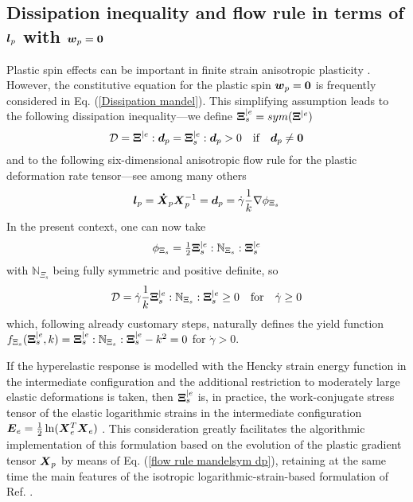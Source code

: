 \documentclass[preprint,review,12pt,sort&compress]{elsarticle}%
\renewcommand{\mathbf}[1]{\mbox{\boldmath $#1$ \unboldmath}  \!\!}
\begin{document}
\subsection{Dissipation inequality and flow rule in terms of $\mathbf{l}_{p}$
with $\mathbf{w}_{p}=\mathbf{0}$}

Plastic spin effects can be important in finite strain anisotropic plasticity
\cite{MontansBathe07}. However, the constitutive equation for the plastic spin
$\mathbf{w}_{p}=\mathbf{0}$ is frequently considered in Eq.
(\ref{Dissipation mandel}). This simplifying assumption leads to the following
dissipation inequality---we define $\mathbf{\Xi}_{s}^{|e}=sym(\mathbf{\Xi
}^{|e})$%
\begin{equation}
\mathcal{D}=\mathbf{\Xi}^{|e}:\mathbf{d}_{p}=\mathbf{\Xi}_{s}^{|e}%
:\mathbf{d}_{p}>0\quad\text{if}\quad\mathbf{d}_{p}\neq\mathbf{0}%
\end{equation}
and to the following six-dimensional anisotropic flow rule for the plastic
deformation rate tensor---see \cite{EidelGruttman03}%
\cite{CamineroMontansBathe11} among many others%
\begin{equation}
\mathbf{l}_{p}=\mathbf{\dot{X}}_{p}\mathbf{X}_{p}^{-1}=\mathbf{d}_{p}%
=\dot{\gamma}\frac{1}{k}\nabla\phi_{\Xi_{s}} \label{flow rule mandelsym dp}%
\end{equation}
In the present context, one can now take%
\begin{equation}
\phi_{\Xi_{s}}=\tfrac{1}{2}\mathbf{\Xi}_{s}^{|e}:\mathbb{N}_{\Xi_{s}%
}:\mathbf{\Xi}_{s}^{|e}%
\end{equation}
with $\mathbb{N}_{\Xi_{s}}$ being fully symmetric and positive definite, so%
\begin{equation}
\mathcal{D}=\dot{\gamma}\frac{1}{k}\mathbf{\Xi}_{s}^{|e}:\mathbb{N}_{\Xi_{s}%
}:\mathbf{\Xi}_{s}^{|e}\geq0\quad\text{for}\quad\dot{\gamma}\geq0
\end{equation}
which, following already customary steps, naturally defines the yield function
$f_{\Xi_{s}}(\mathbf{\Xi}_{s}^{|e},k)=\mathbf{\Xi}_{s}^{|e}:\mathbb{N}%
_{\Xi_{s}}:\mathbf{\Xi}_{s}^{|e}-k^{2}=0$ for $\dot{\gamma}>0$.

If the hyperelastic response is modelled with the Hencky strain energy
function in the intermediate configuration and the additional restriction to
moderately large elastic deformations is taken, then $\mathbf{\Xi}_{s}^{|e}$
is, in practice, the work-conjugate stress tensor of the elastic logarithmic
strains in the intermediate configuration $\mathbf{E}_{e}=\frac{1}{2}%
\ln(\mathbf{X}_{e}^{T}\mathbf{X}_{e})$ \cite{CamineroMontansBathe11}. This
consideration greatly facilitates the algorithmic implementation of this
formulation based on the evolution of the plastic gradient tensor
$\mathbf{X}_{p}$ by means of Eq. (\ref{flow rule mandelsym dp}), retaining at
the same time the main features of the isotropic logarithmic-strain-based
formulation of Ref. \cite{EterovicBathe90}.
\end{document}
